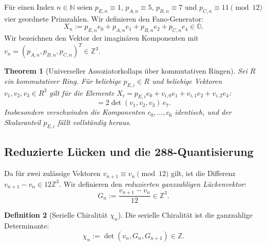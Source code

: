 \documentclass[11pt,a4paper]{article}
\theoremstyle{plain}
\newtheorem{theorem}{Theorem}[section]
\theoremstyle{definition}
\newtheorem{definition}[theorem]{Definition}
\theoremstyle{remark}
\begin{document}
Für einen Index $n \in \mathbb{N}$ seien $p_{E,n} \equiv 1$, $p_{A,n} \equiv 5$, $p_{B,n} \equiv 7$ und $p_{C,n} \equiv 11 \pmod{12}$ vier geordnete Primzahlen. Wir definieren den Fano-Generator:
\begin{equation}
X_n := p_{E,n}e_0 + p_{A,n}e_1 + p_{B,n}e_2 + p_{C,n}e_4 \in \mathbb{O}.
\end{equation}
Wir bezeichnen den Vektor der imaginären Komponenten mit $v_n = (p_{A,n}, p_{B,n}, p_{C,n})^T \in \mathbb{Z}^3$.

\begin{theorem}[Universeller Assoziatorkollaps über kommutativen Ringen]
\label{thm:fano_univ}
Sei $R$ ein kommutativer Ring. Für beliebige $p_{E,i} \in R$ und beliebige Vektoren $v_1, v_2, v_3 \in R^3$ gilt für die Elemente $X_i = p_{E,i}e_0 + v_{i,0}e_1 + v_{i,1}e_2 + v_{i,2}e_4$:
\begin{equation}
[X_1, X_2, X_3] = 2 \det(v_1, v_2, v_3) \, e_7.
\end{equation}
Insbesondere verschwinden die Komponenten $c_0, \dots, c_6$ identisch, und der Skalaranteil $p_{E,i}$ fällt vollständig heraus.
\end{theorem}

\subsection{Reduzierte Lücken und die 288-Quantisierung}

Da für zwei zulässige Vektoren $v_{n+1} \equiv v_n \pmod{12}$ gilt, ist die Differenz $v_{n+1} - v_n \in 12\mathbb{Z}^3$. Wir definieren den \emph{reduzierten ganzzahligen Lückenvektor}:
\begin{equation}
G_n := \frac{v_{n+1} - v_n}{12} \in \mathbb{Z}^3.
\end{equation}

\begin{definition}[Serielle Chiralität $\chi_n$]
Die serielle Chiralität ist die ganzzahlige Determinante:
\begin{equation}
\chi_n := \det(v_n, G_n, G_{n+1}) \in \mathbb{Z}.
\end{equation}
\end{definition}
\end{document}
